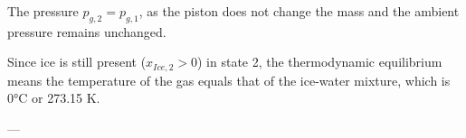 The pressure \( p_{g,2} = p_{g,1} \), as the piston does not change the mass and the ambient pressure remains unchanged.  

Since ice is still present (\( x_{Ice,2} > 0 \)) in state 2, the thermodynamic equilibrium means the temperature of the gas equals that of the ice-water mixture, which is 0°C or 273.15 K.  

---
